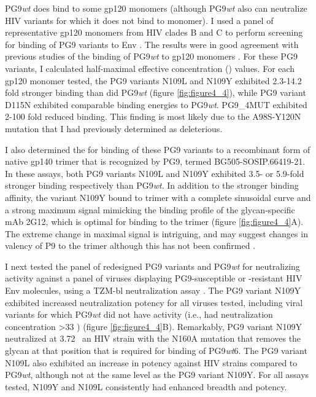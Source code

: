 PG9\textit{wt} does bind to some gp120 monomers (although PG9\textit{wt} also can neutralize HIV variants for which it does not bind to monomer). I used a panel of representative gp120 monomers from HIV clades B and C to perform screening for binding of PG9 variants to Env \citep{Li:2006kv,Li:2005go}. The results were in good agreement with previous studies of the binding of PG9\textit{wt} to gp120 monomers \citep{McLellan:2011dg}. For these PG9 variants, I calculated half-maximal effective concentration (\ec) values. For each gp120 monomer tested, the PG9 variants N109L and N109Y exhibited 2.3-14.2 fold stronger binding than did PG9\textit{wt} (figure \ref{fig:figure4_4}), while PG9 variant D115N exhibited comparable binding energies to PG9\textit{wt}. PG9\_4MUT exhibited 2-100 fold reduced binding. This finding is most likely due to the A98S-Y120N mutation that I had previously determined as deleterious.

I also determined the \ec for binding of these PG9 variants to a recombinant form of native gp140 trimer that is recognized by PG9, termed BG505-SOSIP.66419-21. In these assays, both PG9 variants N109L and N109Y exhibited 3.5- or 5.9-fold stronger binding respectively than PG9\textit{wt}. In addition to the stronger binding affinity, the variant N109Y bound to trimer with a complete sinusoidal curve and a strong maximum signal mimicking the binding profile of the glycan-specific mAb 2G12, which is optimal for binding to the trimer \citep{Sanders:2013gm}  (figure \ref{fig:figure4_4}A). The extreme change in maximal signal is intriguing, and may suggest changes in valency of P9 to the trimer although this has not been confirmed \citep{Julien:2013jp}.

I next tested the panel of redesigned PG9 variants and PG9\textit{wt} for neutralizing activity against a panel of viruses displaying PG9-susceptible or -resistant HIV Env molecules, using a TZM-bl neutralization assay \citep{Montefiori:2009hj}. The PG9 variant N109Y exhibited increased neutralization potency for all viruses tested, including viral variants for which PG9\textit{wt} did not have activity (i.e., had neutralization concentration >33 \mcml) (figure \ref{fig:figure4_4}B). Remarkably, PG9 variant N109Y neutralized at 3.72 \mcml~an HIV strain with the N160A mutation that removes the glycan at that position that is required for binding of PG9\textit{wt}6. The PG9 variant N109L also exhibited an increase in potency against HIV strains compared to PG9\textit{wt}, although not at the same level as the PG9 variant N109Y. For all assays tested, N109Y and N109L consistently had enhanced breadth and potency.

